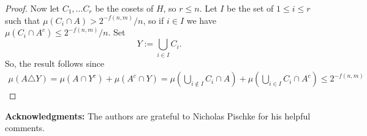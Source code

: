 \documentclass[11pt]{amsart}
\theoremstyle{definition}
\theoremstyle{remark}
\begin{document}
\begin{proof}
    Now let $C_1,\ldots C_r$ be the cosets of $H$, so $r \le n$. Let $I$ be the set of $1 \le i \le r$ such that $\mu(C_i \cap A) > 2^{-f(n,m)}/n$, so if $i \in I$ we have $\mu(C_i \cap A^c) \le 2^{-f(n,m)}/n$. Set 
    \[
    Y:= \bigcup_{i\in I}C_i.
    \]
    So, the result follows since
    \begin{equation*}
        \begin{aligned}
            \mu(A \triangle Y) = \mu(A \cap Y^c) + \mu(A^c \cap Y)
            = \mu\left(\bigcup_{i \notin I} C_i \cap A\right)+ \mu\left(\bigcup_{i \in I} C_i \cap A^c\right)\le  2^{-f(n,m)}
        \end{aligned}
    \end{equation*}

\end{proof}
\noindent
{\bf Acknowledgments:} The authors are grateful to Nicholas Pischke for his helpful comments.
\end{document}
